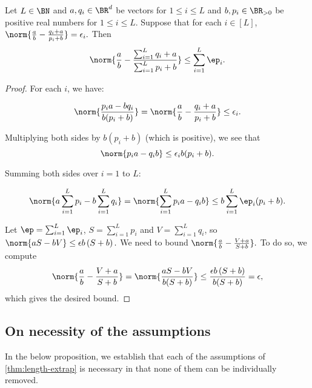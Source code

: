 \documentclass{article}
\begin{document}
\begin{lemma}
  \label{lem:ab-pi-vi}
  Let $L \in \BN$ and $a,q_i \in \BR^d$ be vectors for $1 \leq i \leq L$ and $b, p_i \in \BR_{>0}$ be positive real numbers for $1 \leq i \leq L$. Suppose that for each $i \in [L]$, $\norm{ \frac{a}{b} - \frac{q_i + a}{p_i + b} } = \epsilon_i.$ Then
  \[
\norm{ \frac{a}{b} - \frac{\sum_{i=1}^L q_i + a}{\sum_{i=1}^L p_i + b} } \leq \sum_{i=1}^L \ep_i.
\]
\end{lemma}
\begin{proof}
 For each \( i \), we have:

\[
\norm{ \frac{p_i a - bq_i}{b (p_i + b)} } = \norm{ \frac{a}{b} - \frac{q_i + a}{p_i + b} } \leq \epsilon_i.
\]

Multiplying both sides by \( b (p_i + b) \) (which is positive), we see that
\[
\norm{ p_ia-q_ib } \leq \epsilon_i b (p_i + b).
\]

Summing both sides over \( i = 1 \) to \( L \):

\[
\norm{ a \sum_{i=1}^L p_i - b \sum_{i=1}^L q_i} = \norm{ \sum_{i=1}^L p_ia - q_ib } \leq  b \sum_{i=1}^L\ep_i (p_i + b).
\]


Let $\ep = \sum_{i=1}^L \ep_i$, \( S = \sum_{i=1}^L p_i \) and \( V = \sum_{i=1}^L q_i \), so $ 
\norm{ a S - b V } \leq \epsilon b \left( S +  b \right).$ 
We need to bound $
\norm{ \frac{a}{b} - \frac{V + a}{S + b} }.
$
To do so, we compute
\[
\norm{ \frac{a}{b} - \frac{V + a}{S + b} }=\norm{ \frac{a S - b V}{b (S + b)} } \leq \frac{\epsilon b \left( S +  b \right)}{b (S + b)} = \epsilon,
\]
which gives the desired bound. 
\end{proof}

\subsection{On necessity of the assumptions}
\label{sec:lower-bounds}
In the below proposition, we establish that each of the assumptions of \cref{thm:length-extrap} is necessary in that none of them can be individually removed.
\end{document}

